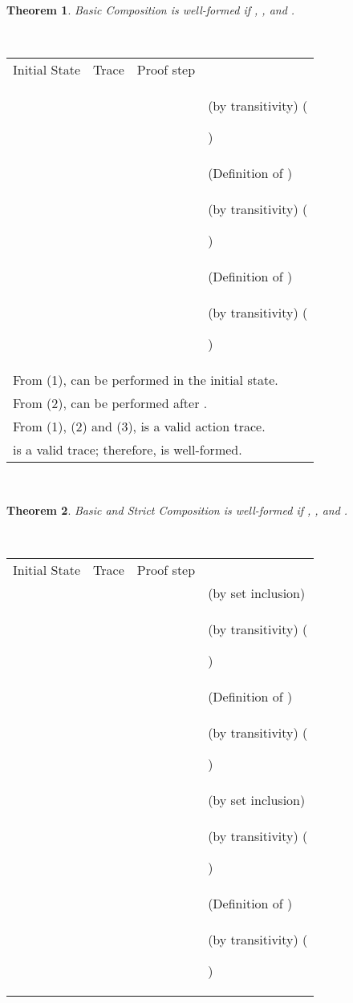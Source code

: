 \documentclass[12pt,journal,letterpaper,onecolumn]{IEEEtran}
\newcounter{myCounter}
\renewcommand{\themyCounter}{\arabic{myCounter}\addtocounter{myCounter}{1}}
\newtheorem{theorem}{Theorem}[section]
\begin{document}
\begin{theorem}
Basic Composition  is well-formed if , , and .\label{theorem:basic}
\end{theorem}
\\
\begin{minipage}{6in} \begin{center}
\begin{tabular}{llp{7.5cm}p{3.8cm}}
Initial State & Trace &  Proof step & \\
 &  &    & (by transitivity)  \hfill(\themyCounter)\\
& &    & (Definition of )\\
& &    & (by transitivity) \hfill(\themyCounter)\\
& &    & (Definition of )\\
& &    & (by transitivity) \hfill(\themyCounter)\\
\multicolumn{4}{l}{From (1),  can be performed in the initial state.}\\
\multicolumn{4}{l}{From (2),  can be performed after .}\\
\multicolumn{4}{l}{From (1), (2) and (3),  is a valid action trace.}\\
\multicolumn{4}{l}{ is a valid trace; therefore,  is well-formed.}\hfill\\
\end{tabular}
\end{center}
\end{minipage}\\


\begin{theorem}
Basic and Strict Composition  is
well-formed if ,
, and .
\label{theorem:basicstrictchoice}
\end{theorem}
\\
\begin{minipage}{6in} \begin{center}
\begin{tabular}{llp{8cm}p{3.8cm}}
Initial State & Trace &  Proof step & \\
 &  & & (by set inclusion)\\
& &    & (by transitivity) \hfill(\themyCounter) \\
& &   &  (Definition of )  \\
& &   & (by transitivity) \hfill(\themyCounter)\\
&  & & (by set inclusion)\\
& &    & (by transitivity) \hfill(\themyCounter) \\
& &   & (Definition of ) \\
& &   & (by transitivity) \hfill(\themyCounter)\\
\end{tabular}
\end{center}
\end{minipage}
\end{document}
